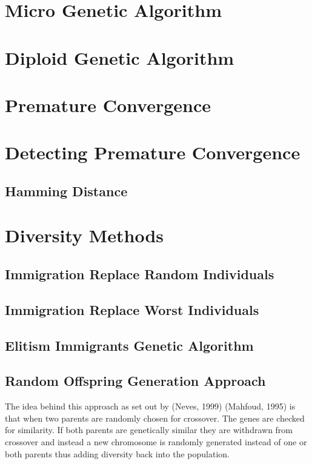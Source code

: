\section{Micro Genetic Algorithm}
\section{Diploid Genetic Algorithm}
\section{Premature Convergence}
\section{Detecting Premature Convergence}
\subsection{Hamming Distance}
\section{Diversity Methods}
\subsection{Immigration Replace Random Individuals}
\subsection{Immigration Replace Worst Individuals}
\subsection{Elitism Immigrants Genetic Algorithm}
\subsection{Random Offspring Generation Approach}
The idea behind this approach as set out by (Neves, 1999) (Mahfoud, 1995) is that when two parents are randomly chosen for crossover.  The genes are checked for similarity. If both parents are genetically similar they are withdrawn from crossover and instead a new chromosome is randomly generated instead of one or both parents thus adding diversity back into the population.
